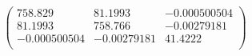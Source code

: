 \documentclass{article}
\begin{document}
\[\left(
\begin{array}{ccc}
 758.829 & 81.1993 & -0.000500504 \\
 81.1993 & 758.766 & -0.00279181 \\
 -0.000500504 & -0.00279181 & 41.4222 \\
\end{array}
\right)\]
\end{document}
